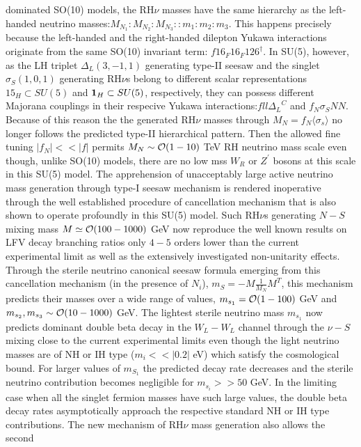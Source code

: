 \documentclass[a4paper,11pt]{article}
\begin{document}
dominated  SO(10) models, the  RH$\nu$ masses have the same hierarchy
as the left-handed neutrino
masses:$M_{N_1}:M_{N_2}:M_{N_3}::m_1:m_2:m_3$. This happens precisely
because the left-handed and the right-handed dilepton Yukawa
interactions originate from the same SO(10) invariant term:
$f{16}_F{16}_F {126}^{\dagger}$. In SU(5), however, as the LH triplet $\Delta_L(3,-1,1)$
generating type-II seesaw and the  singlet $\sigma_S(1,0,1)$
generating RH$\nu$s  belong to different scalar representations
${15}_H\subset SU(5)$ and ${\bf 1}_H\subset SU(5)$, respectively, they
can  possess different Majorana couplings in their respecive Yukawa interactions:$fll{\Delta_L}^C$ and
$f_N\sigma_S N N$. Because of this reason the the generated RH$\nu$
masses through $M_N=f_N\langle \sigma_s \rangle$ no longer follows the
predicted type-II hierarchical pattern. Then the allowed fine tuning
$|f_N|<< |f|$ permits $M_N\sim {\cal O}(1-10)$ TeV  RH neutrino mass scale even though,
unlike SO(10) models, there are no low mss $W_R$ or $Z^{\prime}$ bosons at this scale in this SU(5) model. The apprehension of unacceptably large active neutrino mass generation through type-I seesaw mechanism is rendered inoperative
through  the well established procedure of cancellation mechanism that is
also shown to operate profoundly in this SU(5) model. Such RH$\nu$s  generating $N-S$  mixing mass $M\simeq {\cal O} (100-1000)$ GeV now reproduce the well known results on
 LFV decay branching ratios only $4-5$ orders lower than the current
 experimental limit as well as the extensively investigated
 non-unitarity effects. Through the sterile neutrino canonical seesaw
 formula emerging from this cancellation mechanism (in the presence of
 $N_i$),  $m_S=-M\frac{1}{M_N}M^T$, this mechanism predicts their masses over a wide range of values, $m_{s_1}={\cal O} (1-100)$ GeV and $m_{s_2},m_{s_3} \sim {\cal O}(10-1000)$ GeV. The lightest sterile neutrino mass $m_{s_1}$ now predicts dominant double beta decay in the $W_L-W_L$ channel through the $\nu-S$ mixing close to the current experimental limits even though the light neutrino masses are of NH or IH type ($m_i << |0.2|$ eV) which satisfy the cosmological bound. For larger values of $m_{S_1}$ the predicted decay rate decreases  
and the sterile neutrino contribution becomes negligible for $m_{s_i}>> 50$ GeV.
In the limiting case when all the singlet fermion masses have such large values, the double beta decay rates asymptotically  approach the respective standard NH or IH type  contributions.   
The new mechanism of RH$\nu$ mass generation also allows the second
\end{document}
